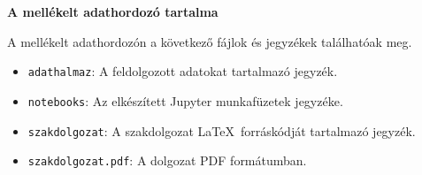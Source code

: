 \pagestyle{empty}

\noindent \textbf{\Large A mellékelt adathordozó tartalma}

\vskip 1cm

\noindent A mellékelt adathordozón a következő fájlok és jegyzékek találhatóak meg.

\begin{itemize}
	\item \texttt{adathalmaz}: A feldolgozott adatokat tartalmazó jegyzék.
	\item \texttt{notebooks}: Az elkészített Jupyter munkafüzetek jegyzéke.
	\item \texttt{szakdolgozat}: A szakdolgozat \LaTeX\ forráskódját tartalmazó jegyzék.
	\item \texttt{szakdolgozat.pdf}: A dolgozat PDF formátumban.
\end{itemize}
